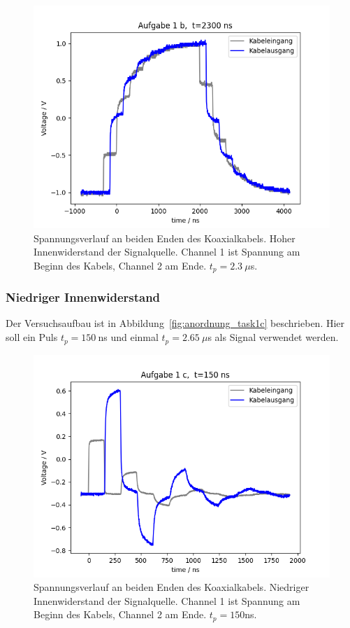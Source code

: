 \documentclass{article}
\begin{document}
\begin{figure}[H]
\centering
\caption{Spannungsverlauf an beiden Enden des Koaxialkabels. Hoher Innenwiderstand der Signalquelle. Channel 1 ist Spannung am Beginn des Kabels, Channel 2 am Ende. $t_p = 2.3~\mu$s.}
\label{fig:task1b_2300ns}
\includegraphics[scale=0.6]{bilder/task1b/task1b_2300ns.png}
\end{figure}



\subsubsection{Niedriger Innenwiderstand}
Der Versuchsaufbau ist in Abbildung~\ref{fig:anordnung_task1c} beschrieben. Hier soll ein Puls $t_p = 150~$ns und einmal $t_p = 2.65~\mu$s  als Signal verwendet werden.

\begin{figure}[H]
\centering
\caption{Spannungsverlauf an beiden Enden des Koaxialkabels. Niedriger Innenwiderstand der Signalquelle. Channel 1 ist Spannung am Beginn des Kabels, Channel 2 am Ende. $t_p = 150$ns.}
\label{fig:task1c_150ns}
\includegraphics[scale=0.6]{bilder/task1c/task1c_150ns.png}
\end{figure}
\end{document}

